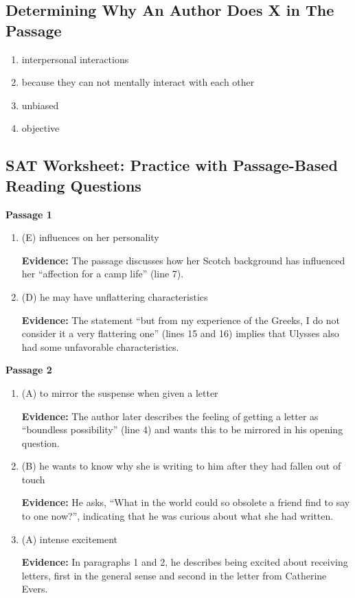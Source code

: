 \begin{enumerate}
\subsection{ Determining Why An Author Does X in The Passage}
\begin{enumerate}
\item interpersonal interactions
\item because they can not mentally interact with each other
\item unbiased
\item objective
\end{enumerate}
\subsection{SAT Worksheet: Practice with Passage-Based Reading Questions} 
\textbf{Passage 1}
\begin{enumerate}
\item (E) influences on her personality

\bigskip
\textbf{Evidence:} The passage discusses how her Scotch background has influenced her ``affection for a camp life'' (line 7). 
\item (D) he may have unflattering characteristics

\bigskip
\textbf{Evidence:} The statement ``but from my experience of the Greeks, I do not consider it a very flattering one'' (lines 15 and 16) implies that Ulysses also had some unfavorable characteristics. 
\end{enumerate}

\textbf{Passage 2}
\begin{enumerate}
\item (A) to mirror the suspense when given a letter

\bigskip
\textbf{Evidence:} The author later describes the feeling of getting a letter as ``boundless possibility'' (line 4) and wants this to be mirrored in his opening question.
\item (B) he wants to know why she is writing to him after they had fallen out of touch

\bigskip
\textbf{Evidence:} He asks, ``What in the world could so obsolete a friend find to say to one now?'', indicating that he was curious about what she had written.
\item (A) intense excitement

\bigskip
\textbf{Evidence:} In paragraphs 1 and 2, he describes being excited about receiving letters, first in the general sense and second in the letter from Catherine Evers.


\end{enumerate}
\end{enumerate}
